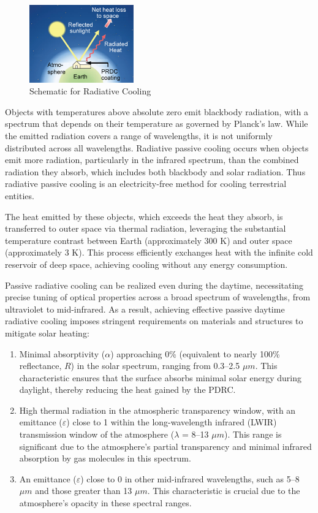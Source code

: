 \begin{figure}
  \centering
  \includegraphics[width=0.4\textwidth]{Chapters/Figures/Schematic for Radiative Cooling.png}
  \caption{Schematic for Radiative Cooling}
\end{figure}
Objects with temperatures above absolute zero emit blackbody radiation, with a spectrum that depends on their temperature as governed by Planck's law. While the emitted radiation covers a range of wavelengths, it is not uniformly distributed across all wavelengths. Radiative passive cooling occurs when objects emit more radiation, particularly in the infrared spectrum, than the combined radiation they absorb, which includes both blackbody and solar radiation. Thus radiative passive cooling is an electricity-free method for cooling terrestrial entities. %

The heat emitted by these objects, which exceeds the heat they absorb, is transferred to outer space via thermal radiation, leveraging the substantial temperature contrast between Earth (approximately 300 K) and outer space (approximately 3 K). This process efficiently exchanges heat with the infinite cold reservoir of deep space, achieving cooling without any energy consumption. %

Passive radiative cooling can be realized even during the daytime, necessitating precise tuning of optical properties across a broad spectrum of wavelengths, from ultraviolet to mid-infrared. As a result, achieving effective passive daytime radiative cooling imposes stringent requirements on materials and structures to mitigate solar heating: %

\begin{enumerate}
\item Minimal absorptivity ($\alpha$) approaching 0\% (equivalent to nearly 100\% reflectance, $R$) in the solar spectrum, ranging from 0.3–2.5 $\mu m$. This characteristic ensures that the surface absorbs minimal solar energy during daylight, thereby reducing the heat gained by the PDRC.
\item High thermal radiation in the atmospheric transparency window, with an emittance ($\varepsilon$) close to 1 within the long-wavelength infrared (LWIR) transmission window of the atmosphere ($\lambda$ = 8–13 $\mu m$). This range is significant due to the atmosphere's partial transparency and minimal infrared absorption by gas molecules in this spectrum. %
\item An emittance ($\varepsilon$) close to 0 in other mid-infrared wavelengths, such as 5–8 $\mu m$ and those greater than 13 $\mu m$. This characteristic is crucial due to the atmosphere's opacity in these spectral ranges. %
\end{enumerate}

